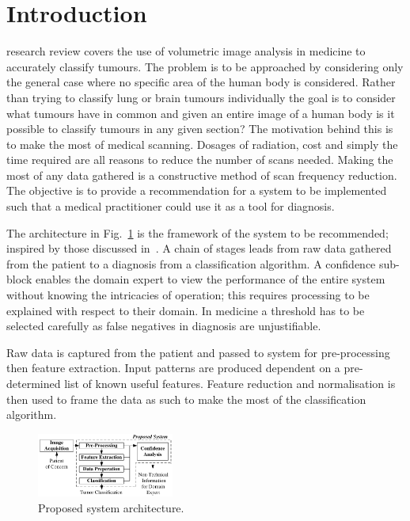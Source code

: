 \documentclass[journal]{IEEEtran}
\begin{document}
\section{Introduction}
 research review covers the use of volumetric image analysis in medicine to accurately classify tumours. 
The problem is to be approached by considering only the general case where no specific area of the human body is considered.
Rather than trying to classify lung or brain tumours individually the goal is to consider what tumours have in common and given an entire image of a human body is it possible to classify tumours in any given section?
The motivation behind this is to make the most of medical scanning.
Dosages of radiation, cost and simply the time required are all reasons to reduce the number of scans needed.
Making the most of any data gathered is a constructive method of scan frequency reduction.
The objective is to provide a recommendation for a system to be implemented such that a medical practitioner could use it as a tool for diagnosis.  

The architecture in Fig.~\ref{fig:Proposed} is the framework of the system to be recommended; inspired by those discussed in~\cite{ahmed2011efficacy,kumar2011classification,sachdeva2011multiclass,kostis03three}.
A chain of stages leads from raw data gathered from the patient to a diagnosis from a classification algorithm.
A confidence sub-block enables the domain expert to view the performance of the entire system without knowing the intricacies of operation; this requires processing to be explained with respect to their domain.
In medicine a threshold has to be selected carefully as false negatives in diagnosis are unjustifiable.

Raw data is captured from the patient and passed to system for pre-processing then feature extraction.
Input patterns are produced dependent on a pre-determined list of known useful features. 
Feature reduction and normalisation is then used to frame the data as such to make the most of the classification algorithm.

\begin{figure}[!htb]
   \centering
   \includegraphics[width = 0.4\textwidth]{Figures/Proposed.pdf}
   \caption{Proposed system architecture.}
   \label{fig:Proposed}
\end{figure}
\end{document}

